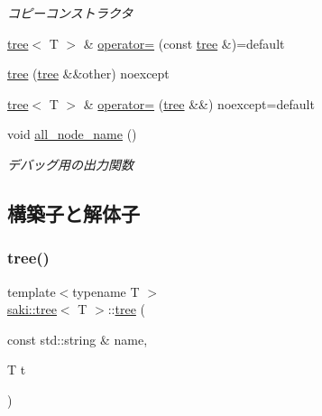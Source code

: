 \begin{DoxyCompactItemize}
\begin{DoxyCompactList}\small\item\em コピーコンストラクタ \end{DoxyCompactList}\item 
\mbox{\hyperlink{classsaki_1_1tree}{tree}}$<$ T $>$ \& \mbox{\hyperlink{classsaki_1_1tree_aaeea7b41a15310740f23776e50c77554}{operator=}} (const \mbox{\hyperlink{classsaki_1_1tree}{tree}} \&)=default
\item 
\mbox{\hyperlink{classsaki_1_1tree_a4f1e3143448f197379d7d369270a386a}{tree}} (\mbox{\hyperlink{classsaki_1_1tree}{tree}} \&\&other) noexcept
\item 
\mbox{\hyperlink{classsaki_1_1tree}{tree}}$<$ T $>$ \& \mbox{\hyperlink{classsaki_1_1tree_ac5212002d014e676b9c43f4dbbef595f}{operator=}} (\mbox{\hyperlink{classsaki_1_1tree}{tree}} \&\&) noexcept=default
\item 
void \mbox{\hyperlink{classsaki_1_1tree_a1ae83219f556f066db0ab5307c1a46d6}{all\+\_\+node\+\_\+name}} ()
\begin{DoxyCompactList}\small\item\em デバッグ用の出力関数 \end{DoxyCompactList}\end{DoxyCompactItemize}


\subsection{構築子と解体子}
\mbox{\label{classsaki_1_1tree_a43b93f5855c1def3b61018344d14e809}} 
\subsubsection{\texorpdfstring{tree()}{tree()}\hspace{0.1cm}{\footnotesize\ttfamily [1/3]}}
{\footnotesize\ttfamily template$<$typename T $>$ \\
\mbox{\hyperlink{classsaki_1_1tree}{saki\+::tree}}$<$ T $>$\+::\mbox{\hyperlink{classsaki_1_1tree}{tree}} (\begin{DoxyParamCaption}\item[{const std\+::string \&}]{name,  }\item[{T}]{t }\end{DoxyParamCaption})\hspace{0.3cm}{\ttfamily [inline]}}



